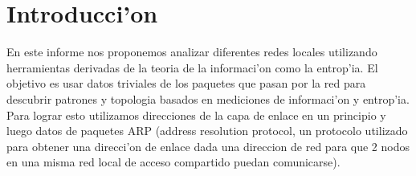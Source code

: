\section{Introducci'on}
En este informe nos proponemos analizar diferentes redes locales utilizando herramientas derivadas de la
teoria de la informaci'on como la entrop'ia. El objetivo es usar datos triviales de los paquetes que pasan
por la red para descubrir patrones y topologia basados en mediciones de informaci'on y entrop'ia. Para lograr esto
utilizamos direcciones de la capa de enlace en un principio y luego datos de paquetes ARP (address resolution protocol,
un protocolo  utilizado para obtener una direcci'on de enlace dada una direccion de red para que 2 nodos en 
una misma red local de acceso compartido puedan comunicarse).
